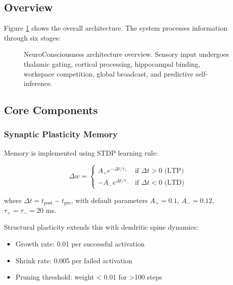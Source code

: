 \documentclass[twocolumn,10pt]{article}
\begin{document}
\subsection{Overview}

Figure \ref{fig:architecture} shows the overall architecture. The system processes information through six stages:

\begin{figure}[h]
    \centering
    \caption{NeuroConsciousness architecture overview. Sensory input undergoes thalamic gating, cortical processing, hippocampal binding, workspace competition, global broadcast, and predictive self-inference.}
    \label{fig:architecture}
\end{figure}

\subsection{Core Components}

\subsubsection{Synaptic Plasticity Memory}

Memory is implemented using STDP learning rule:

\begin{equation}
\Delta w = 
\begin{cases} 
A_+ e^{-\Delta t/\tau_+} & \text{if } \Delta t > 0 \text{ (LTP)} \\
-A_- e^{\Delta t/\tau_-} & \text{if } \Delta t < 0 \text{ (LTD)}
\end{cases}
\end{equation}

where $\Delta t = t_{\text{post}} - t_{\text{pre}}$, with default parameters $A_+ = 0.1$, $A_- = 0.12$, $\tau_+ = \tau_- = 20$ ms.

Structural plasticity extends this with dendritic spine dynamics:
\begin{itemize}
    \item Growth rate: 0.01 per successful activation
    \item Shrink rate: 0.005 per failed activation
    \item Pruning threshold: weight < 0.01 for >100 steps
\end{itemize}
\end{document}
